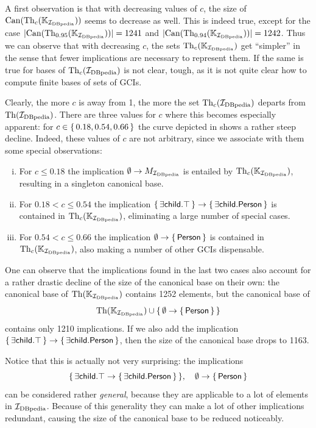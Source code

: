 A first observation is that with decreasing values of $c$, the size of $\operatorname{Can}(\operatorname{Th}_c({\mathbb{K}}_{{\mathcal{I}_{\text{DBpedia}}}}))$ seems to decrease as well.  This is indeed true, except for the case
$\lvert \operatorname{Can}(\operatorname{Th}_{0.95}({\mathbb{K}}_{{\mathcal{I}_{\text{DBpedia}}}})) \rvert = 1241$ and $\lvert \operatorname{Can}( \operatorname{Th}_{0.94}({\mathbb{K}}_{{\mathcal{I}_{\text{DBpedia}}}})) \rvert = 1242$.  Thus we can observe that with decreasing $c$, the sets
$\operatorname{Th}_c({\mathbb{K}}_{{\mathcal{I}_{\text{DBpedia}}}})$ get ``simpler'' in the sense that fewer implications are
necessary to represent them.  If the same is true for bases of $\operatorname{Th}_c({\mathcal{I}_{\text{DBpedia}}})$ is not
clear, tough, as it is not quite clear how to compute finite bases of sets of GCIs.

Clearly, the more $c$ is away from 1, the more the set $\operatorname{Th}_c({\mathcal{I}_{\text{DBpedia}}})$ departs from
$\operatorname{Th}({\mathcal{I}_{\text{DBpedia}}})$.  There are three values for $c$ where this becomes especially apparent:
for $c \in {\ensuremath{\{\, 0.18, 0.54, 0.66 \,\}}}$ the curve depicted in
 shows a rather steep decline.  Indeed, these values of
$c$ are not arbitrary, since we associate with them some special observations:
\begin{enumerate}[i. ]
\item For $c \leq 0.18$ the implication $\emptyset \to M_{{\mathcal{I}_{\text{DBpedia}}}}$ is entailed by
  $\operatorname{Th}_c({\mathbb{K}}_{{\mathcal{I}_{\text{DBpedia}}}})$, resulting in a singleton canonical base.
\item For $0.18 < c \leq 0.54$ the implication ${\{\, \mathsf{\exists child. \top} \,\}} \to
  {\ensuremath{\{\, \mathsf{\exists child. Person} \,\}}}$ is contained in $\operatorname{Th}_c({\mathbb{K}}_{{\mathcal{I}_{\text{DBpedia}}}})$,
  eliminating a large number of special cases.
\item For $0.54 < c \leq 0.66$ the implication $\emptyset \to {\ensuremath{\{\, \mathsf{Person} \,\}}}$ is
  contained in $\operatorname{Th}_c({\mathbb{K}}_{{\mathcal{I}_{\text{DBpedia}}}})$, also making a number of other GCIs
  dispensable.
\end{enumerate}

One can observe that the implications found in the last two cases also account for a
rather drastic decline of the size of the canonical base on their own: the canonical base
of $\operatorname{Th}({\mathbb{K}}_{{\mathcal{I}_{\text{DBpedia}}}})$ contains 1252 elements, but the canonical base of
\begin{equation*}
  \operatorname{Th}({\mathbb{K}}_{{\mathcal{I}_{\text{DBpedia}}}}) \cup {\ensuremath{\{\, \emptyset \to {\ensuremath{\{\, \mathsf{Person} \,\}}} \,\}}}
\end{equation*}
contains only 1210 implications.  If we also add the implication ${\{\, \mathsf{\exists
    child. \top} \,\}} \to {\ensuremath{\{\, \mathsf{\exists child. Person} \,\}}}$, then the size of the
canonical base drops to 1163.

Notice that this is actually not very surprising: the implications
\begin{equation*}
  {\ensuremath{\{\, \mathsf{\exists  child. \top} \to {\ensuremath{\{\, \mathsf{\exists child. Person} \,\}}} \,\}}}, \quad
  \emptyset \to {\ensuremath{\{\, \mathsf{Person} \,\}}}
\end{equation*}
can be considered rather \emph{general}, because they are applicable to a lot of elements
in ${\mathcal{I}_{\text{DBpedia}}}$.  Because of this generality they can make a lot of other implications
redundant, causing the size of the canonical base to be reduced noticeably.

